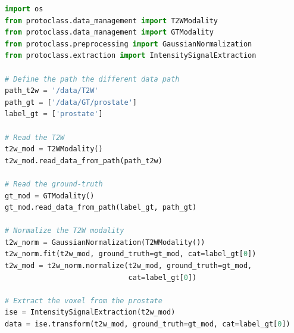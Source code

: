 \begin{lstlisting}[language=Python, caption=Code snippet to normalize a volume and extract some voxels.]
import os
from protoclass.data_management import T2WModality
from protoclass.data_management import GTModality
from protoclass.preprocessing import GaussianNormalization
from protoclass.extraction import IntensitySignalExtraction

# Define the path the different data path
path_t2w = '/data/T2W'
path_gt = ['/data/GT/prostate']
label_gt = ['prostate']

# Read the T2W
t2w_mod = T2WModality()
t2w_mod.read_data_from_path(path_t2w)

# Read the ground-truth
gt_mod = GTModality()
gt_mod.read_data_from_path(label_gt, path_gt)

# Normalize the T2W modality
t2w_norm = GaussianNormalization(T2WModality())
t2w_norm.fit(t2w_mod, ground_truth=gt_mod, cat=label_gt[0])
t2w_mod = t2w_norm.normalize(t2w_mod, ground_truth=gt_mod,
                             cat=label_gt[0])

# Extract the voxel from the prostate
ise = IntensitySignalExtraction(t2w_mod)
data = ise.transform(t2w_mod, ground_truth=gt_mod, cat=label_gt[0])
\end{lstlisting}

